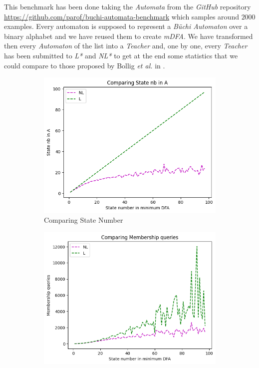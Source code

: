 This benchmark has been done taking the \textit{Automata} from the \textit{GitHub} repository \url{https://github.com/parof/buchi-automata-benchmark} which samples around $2000$ examples. Every automaton is supposed to represent a \textit{Büchi Automaton} over a binary alphabet and we have reused them to create \textit{mDFA}. We have transformed then every \textit{Automaton} of the list into a \textit{Teacher} and, one by one, every \textit{Teacher} has been submitted to \textit{L*} and \textit{NL*} to get at the end some statistics that we could compare to those proposed by Bollig \textit{et al.} in \cite{NLPaper}.

\begin{figure}[!htb]
  \centering
  \begin{subfigure}[b]{0.25\textwidth}
    \includegraphics[width=\textwidth]{../statistics/plots/BenchMark/State nb in A.png}
    \caption{Comparing State Number}
    \label{fig:StateBenchMarkCompare}
  \end{subfigure}
  \begin{subfigure}[b]{0.25\textwidth}
    \includegraphics[width=\textwidth]{../statistics/plots/BenchMark/Membership queries.png}

\end{subfigure}
\end{figure}
